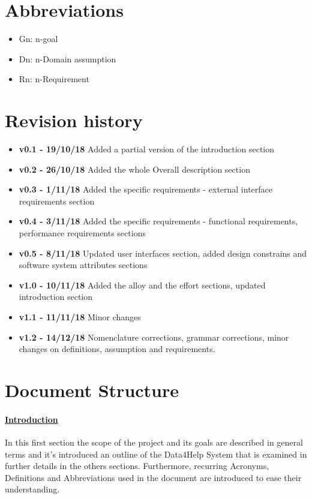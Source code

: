 \section{Abbreviations}
\begin{itemize}
\item Gn: n-goal
\item Dn: n-Domain assumption
\item Rn: n-Requirement
\end{itemize}

\section{Revision history}
\begin{itemize}
\item \textbf{v0.1 - 19/10/18} Added a partial version of the introduction section
\item \textbf{v0.2 - 26/10/18} Added the whole Overall description section
\item \textbf{v0.3 - 1/11/18} Added the specific requirements - external interface requirements section 
\item \textbf{v0.4 - 3/11/18} Added the specific requirements - functional requirements, performance requirements sections
\item \textbf{v0.5 - 8/11/18} Updated user interfaces section, added design constrains and software system attributes sections
\item \textbf{v1.0 - 10/11/18} Added the alloy and the effort sections, updated introduction section 
\item \textbf{v1.1 - 11/11/18} Minor changes
\item \textbf{v1.2 - 14/12/18} Nomenclature corrections, grammar corrections, minor changes on definitions, assumption and requirements.
\end{itemize}
\section{Document Structure}
\paragraph{\hyperref[sect:introduction]{Introduction}} In this first section the scope of the project and its goals are described in general terms and it's introduced an outline of the Data4Help System that is examined in further details in the others sections. Furthermore, recurring Acronyms, Definitions and Abbreviations used in the document are introduced to ease their understanding.
